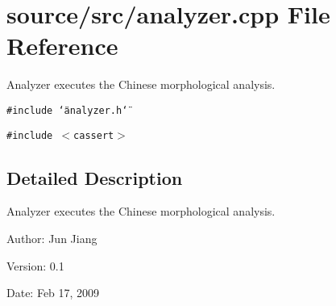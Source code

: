 \section{source/src/analyzer.cpp File Reference}
\label{analyzer_8cpp}
Analyzer executes the Chinese morphological analysis.  


{\tt \#include \char`\"{}analyzer.h\char`\"{}}\par
{\tt \#include $<$cassert$>$}\par


\subsection{Detailed Description}
Analyzer executes the Chinese morphological analysis. 

\begin{Desc}
\item[Author:]Jun Jiang \end{Desc}
\begin{Desc}
\item[Version:]0.1 \end{Desc}
\begin{Desc}
\item[Date:]Feb 17, 2009 \end{Desc}
